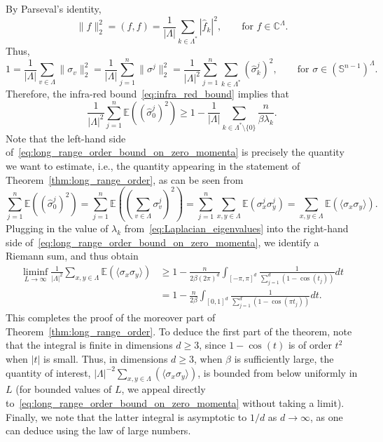 \documentclass[12pt,reqno]{article}
\def\C{\mathbb{C}}
\def\E{\mathbb{E}}
\renewcommand{\S}{\mathbb{S}}
\begin{document}
By Parseval's identity,
\[ \|f\|_2^2 = (f,f) = \frac{1}{|\Lambda|} \sum_{k \in \Lambda^*} |\hat{f}_k|^2 ,\qquad\text{for }f \in \C^\Lambda .\]
Thus,
\[ 1 = \frac{1}{|\Lambda|} \sum_{v \in \Lambda} \|\sigma_v\|_2^2 = \frac{1}{|\Lambda|} \sum_{j=1}^n \|\sigma^j\|_2^2 = \frac{1}{|\Lambda|^2} \sum_{j=1}^n \sum_{k \in \Lambda^*} (\hat{\sigma}^j_k)^2 , \qquad\text{for }\sigma \in \left(\S^{n-1}\right)^\Lambda .\]
Therefore, the infra-red bound~\eqref{eq:infra_red_bound} implies that
\begin{equation}\label{eq:long_range_order_bound_on_zero_momenta}
\frac{1}{|\Lambda|^2} \sum_{j=1}^n \E\left((\hat{\sigma}^j_0)^2\right) \ge 1 - \frac{1}{|\Lambda|} \sum_{k \in \Lambda^* \setminus \{0\}} \frac{n}{\beta \lambda_k} .
\end{equation}
Note that the left-hand side of~\eqref{eq:long_range_order_bound_on_zero_momenta} is precisely the quantity we want to estimate, i.e., the quantity appearing in the statement of Theorem~\ref{thm:long_range_order}, as can be seen from
\[ \sum_{j=1}^n \E\left((\hat{\sigma}^j_0)^2\right) = \sum_{j=1}^n \E\left( \left( \sum_{v \in \Lambda} \sigma^j_v \right)^2 \right) = \sum_{j=1}^n \sum_{x,y \in \Lambda} \E\left( \sigma^j_x \sigma^j_y \right) = \sum_{x,y \in \Lambda} \E\left( \langle \sigma_x \sigma_y \rangle \right) .\]
Plugging in the value of $\lambda_k$ from~\eqref{eq:Laplacian_eigenvalues} into the right-hand side of~\eqref{eq:long_range_order_bound_on_zero_momenta}, we identify a Riemann sum, and thus obtain
\begin{align*}
\liminf_{L \to \infty} \frac{1}{|\Lambda|^2} \sum_{x,y \in \Lambda} \E\left( \langle \sigma_x \sigma_y \rangle \right) &\ge 1 - \frac{n}{2\beta (2\pi)^d} \int_{[-\pi,\pi]^d} \frac{1}{\sum_{j=1}^d (1 - \cos(t_j))}dt \\&= 1 - \frac{n}{2\beta} \int_{[0,1]^d} \frac{1}{\sum_{j=1}^d (1 - \cos(\pi t_j))}dt .
\end{align*}
This completes the proof of the moreover part of Theorem~\ref{thm:long_range_order}. To deduce the first part of the theorem,
note that the integral is finite in dimensions $d\ge 3$, since $1 - \cos(t)$ is of order $t^2$ when $|t|$ is small. Thus, in dimensions $d \ge 3$, when $\beta$ is sufficiently large, the quantity of interest, $|\Lambda|^{-2} \sum_{x,y \in \Lambda} ( \langle \sigma_x \sigma_y \rangle )$, is bounded from below uniformly in $L$ (for bounded values of $L$, we appeal directly to~\eqref{eq:long_range_order_bound_on_zero_momenta} without taking a limit).
Finally, we note that the latter integral is asymptotic to $1/d$ as $d \to \infty$, as one can deduce using the law of large numbers.
\end{document}

